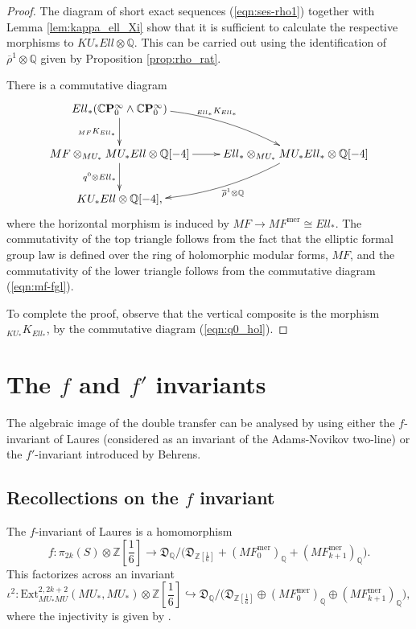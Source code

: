 \documentclass[10pt,a4paper]{amsart}
\theoremstyle{definition}
\theoremstyle{remark}
\newcommand{\rhobar}{\overline{\rho}}
\newcommand{\zedsix}{{\zed[{\scriptstyle{\frac{1}{6}}}]}}
\newcommand{\divcong}{\mathfrak{D}}
\newcommand{\ext}{\mathrm{Ext}}
\newcommand{\zed}{\mathbb{Z}}
\newcommand{\rat}{\mathbb{Q}}
\newcommand{\mf}{{MF}}
\newcommand{\mfmero}{\mf^{\mathrm{mer}}}
\newcommand{\tmfcoeff}{{Ell}}
\newcommand{\cp}{\mathbb{C} \mathbf{P}^\infty}
\renewcommand{\smash}{\wedge}
\begin{document}
\begin{proof}
	The diagram of short exact sequences (\ref{eqn:ses-rho1}) together
with Lemma \ref{lem:kappa_ell_Xi} show that it is sufficient to calculate the
respective morphisms to $KU_* \tmfcoeff \otimes \rat$. This can be carried out
using the identification of $\rhobar^1 \otimes \rat$ given by Proposition \ref{prop:rho_rat}.

There is a commutative diagram
\[
 \xymatrix{
\tmfcoeff_* (\cp_0 \smash \cp_0)
\ar@/^1pc/[rd]^{_{\tmfcoeff_*}K_{\tmfcoeff_*}}
\ar[d]_{_{\mf}K_{\tmfcoeff_*}}
\\
\mf \otimes_{MU_*} MU_*\tmfcoeff  \otimes \rat [-4]
\ar[d]_{q^0 \otimes \tmfcoeff_*}
\ar[r]
&
\tmfcoeff_* \otimes _{MU_*} MU_* \tmfcoeff_*\otimes
\rat [-4]
\ar@/^1pc/[ld]^(.4){\rhobar^1 \otimes \rat}
\\
KU_* \tmfcoeff \otimes \rat [-4],
}
\]
where the horizontal morphism is induced by $\mf \rightarrow  \mfmero \cong \tmfcoeff_*$.
The commutativity of the top triangle follows from the fact that the
elliptic formal  group law  is defined over the ring of holomorphic modular forms, $\mf$, and the commutativity of
the lower triangle follows from the commutative diagram (\ref{eqn:mf-fgl}).

To complete the proof, observe that the vertical composite is the morphism $_{KU_*}K_{\tmfcoeff_*}$, by the
commutative diagram (\ref{eqn:q0_hol}).
\end{proof}





%
\section{The $f$ and $f'$ invariants}
\label{sect:invariants}

The algebraic image of the double transfer can be analysed by using either the $f$-invariant of Laures (considered as an
invariant of the Adams-Novikov two-line) or the $f'$-invariant introduced by Behrens.

\subsection{Recollections on the $f$ invariant}
\label{subsect:f_inv}

The $f$-invariant of Laures  \cite{laures} is a
homomorphism
\[
	f :
\pi_{2k}(S) \otimes \zedsix
\rightarrow
\divcong _\rat / \Big( \divcong_\zedsix + (\mfmero_0)_\rat +
(\mfmero_{k+1})_\rat \Big).
\]
This factorizes across an invariant
\[
\iota^2 : 	\ext^{2,2k+2} _{MU_*MU} (MU_* , MU_*) \otimes \zedsix
\hookrightarrow
\divcong _\rat / \Big(\divcong_\zedsix \oplus (\mfmero_0)_\rat \oplus
(\mfmero_{k+1})_\rat \Big),
\]
where the injectivity is given by \cite[Proposition 3.9]{laures}.
\end{document}

